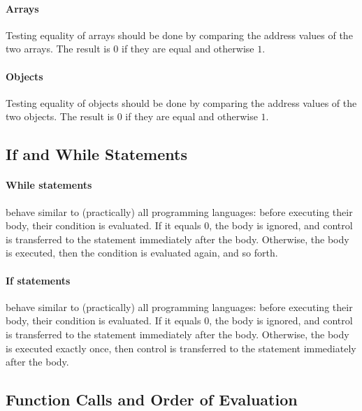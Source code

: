 \documentclass{article}
\begin{document}
\paragraph{Arrays}
Testing equality of arrays should be done by comparing the address values of the two arrays.
The result is $0$ if they are equal and otherwise $1$.
\paragraph{Objects}
Testing equality of objects should be done by comparing the address values of the two objects.
The result is $0$ if they are equal and otherwise $1$.
\newpage
\subsection{If and While Statements}
\label{subsection_If_And_While_Statements}
\paragraph{While statements} behave similar to (practically) all programming languages:
before executing their body, their condition is evaluated.
If it equals $0$, the body is ignored, and control is transferred
to the statement immediately after the body.
Otherwise, the body is executed, then the condition is evaluated again, and so forth. 
\paragraph{If statements} behave similar to (practically) all programming languages:
before executing their body, their condition is evaluated.
If it equals $0$, the body is ignored, and control is transferred
to the statement immediately after the body.
Otherwise, the body is executed exactly once,
then control is transferred to the statement immediately after the body. 
\subsection{Function Calls and Order of Evaluation}
\label{subsection_Function_Calls_And_Order_Of_Evaluation}
\end{document}
